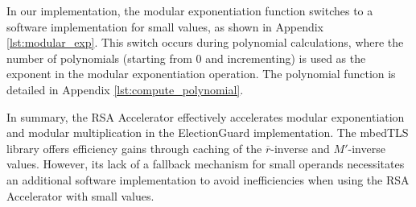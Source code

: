 In our implementation, the modular exponentiation function switches to a software implementation for small values, as shown in Appendix \ref{lst:modular_exp}. This switch occurs during polynomial calculations, where the number of polynomials (starting from 0 and incrementing) is used as the exponent in the modular exponentiation operation. The polynomial function is detailed in Appendix \ref{lst:compute_polynomial}.

In summary, the RSA Accelerator effectively accelerates modular exponentiation and modular multiplication in the ElectionGuard implementation. The mbedTLS library offers efficiency gains through caching of the \( \overline{r} \)-inverse and \( M' \)-inverse values. However, its lack of a fallback mechanism for small operands necessitates an additional software implementation to avoid inefficiencies when using the RSA Accelerator with small values.


